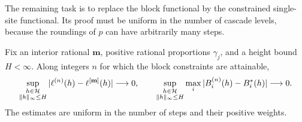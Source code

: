 The remaining task is to replace the block functional by the constrained
single-site functional. Its proof must be uniform in the number of
cascade levels, because the roundings of $p$ can have arbitrarily many
steps.

\begin{lemma}\label{mag:replacement}
Fix an interior rational $\mathbf m$, positive rational proportions
$\gamma_j$, and a height bound $H<\infty$. Along integers $n$ for which
the block constraints are attainable,
\begin{equation}\label{mag:replacement-estimates}
 \sup_{\substack{h\in\mathcal H\\\|h\|_\infty\le H}}
       |\ell^{(n)}(h)-\ell^{[\mathbf m]}(h)|\longrightarrow0,
 \qquad
 \sup_{\substack{h\in\mathcal H\\\|h\|_\infty\le H}}
       \max_i|B_i^{(n)}(h)-B_i^*(h)|\longrightarrow0.
\end{equation}
The estimates are uniform in the number of steps and their positive
weights.
\end{lemma}

